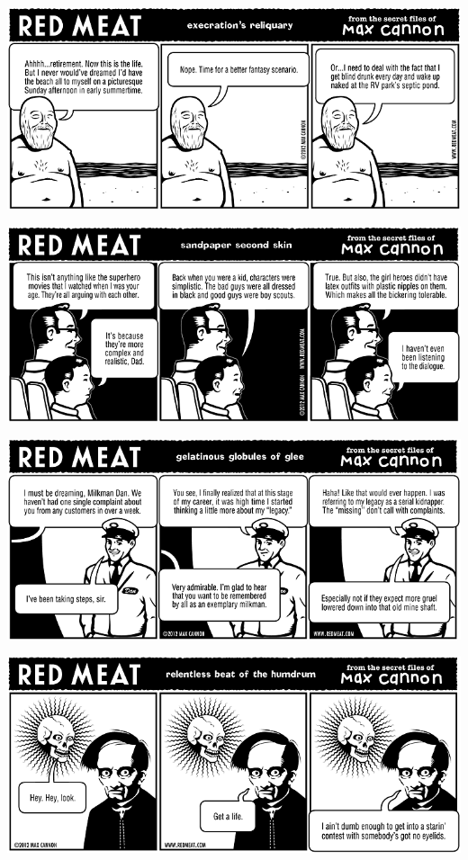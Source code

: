 \documentclass[a4paper,twoside,11pt]{article}
\begin{document}
\includegraphics[width=\textwidth]{redmeat_2012-05-29.png}



\includegraphics[width=\textwidth]{redmeat_2012-06-05.png}



\includegraphics[width=\textwidth]{redmeat_2012-06-12.png}



\includegraphics[width=\textwidth]{redmeat_2012-06-19.png}
\end{document}
